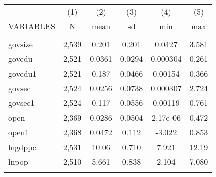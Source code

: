 \documentclass[]{article}
\begin{document}
\begin{tabular}{lccccc} \hline
 & (1) & (2) & (3) & (4) & (5) \\
VARIABLES & N & mean & sd & min & max \\ \hline
 &  &  &  &  &  \\
govsize & 2,539 & 0.201 & 0.201 & 0.0427 & 3.581 \\
govedu & 2,521 & 0.0361 & 0.0294 & 0.000304 & 0.261 \\
govedu1 & 2,521 & 0.187 & 0.0466 & 0.00154 & 0.366 \\
govsec & 2,524 & 0.0256 & 0.0738 & 0.000307 & 2.724 \\
govsec1 & 2,524 & 0.117 & 0.0556 & 0.00119 & 0.761 \\
open & 2,369 & 0.0286 & 0.0504 & 2.17e-06 & 0.472 \\
open1 & 2,368 & 0.0472 & 0.112 & -3.022 & 0.853 \\
lngdppc & 2,531 & 10.06 & 0.710 & 7.921 & 12.19 \\
lnpop & 2,510 & 5.661 & 0.838 & 2.104 & 7.080 \\
 &  &  &  &  &  \\ \hline
\end{tabular}
\end{document}
